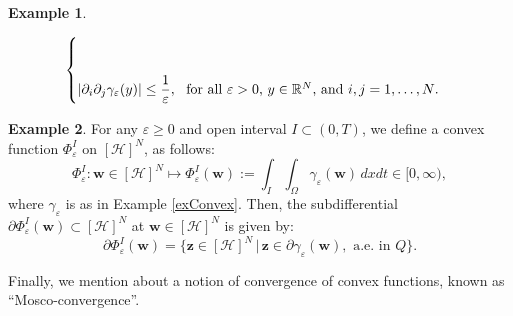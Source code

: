 \documentclass{sinst}
\numberwithin{equation}{section}
\theoremstyle{plain}
\theoremstyle{definition}
\newtheorem{ex}{Example}
\def\R{\mathbb{R}}
\def\sH{\mathscr{H}}
\def\ds{\displaystyle}
\begin{document}
\begin{ex}
\begin{description}
\begin{equation}
\begin{aligned}
\begin{cases}
            \\[3ex]
        \ds 
            |\partial_i \partial_j \gamma_\varepsilon(y)| \leq \frac{1}{\varepsilon}, ~ \mbox{ for all $ \varepsilon > 0 $, $ y \in \R^N $, and $ i, j = 1, \dots, N $.}
        \end{cases}
    \end{aligned}\label{exM01}
    \end{equation}
\end{description}
\end{ex}

\begin{ex} \label{exConvex2}
    For any $\varepsilon \geq 0$ and open interval $I \subset (0,T)$, we define a convex function $\Phi_\varepsilon^I$ on $[\sH]^N$, as follows:
    \begin{equation}
        \Phi_\varepsilon^I:{\bm w} \in [\sH]^N \mapsto \Phi_\varepsilon^I({\bm w}) := \int_I \int_\Omega \gamma_\varepsilon({\bm w}) \,dxdt \in [0,\infty),
    \end{equation}
    where $\gamma_\varepsilon$ is as in Example \ref{exConvex}. Then, the subdifferential $\partial \Phi_\varepsilon^I({\bm w}) \subset [\sH]^N$ at ${\bm w} \in [\sH]^N$ is given by:
    \begin{equation}
        \partial \Phi_\varepsilon^I({\bm w}) = \{ {\bm z} \in [\sH]^N \,| \,{\bm z} \in \partial \gamma_\varepsilon({\bm w}), \mbox{ a.e. in } Q \}. 
    \end{equation}
\end{ex}

Finally, we mention about a notion of convergence of convex functions, known as ``Mosco-convergence''.
\end{document}
